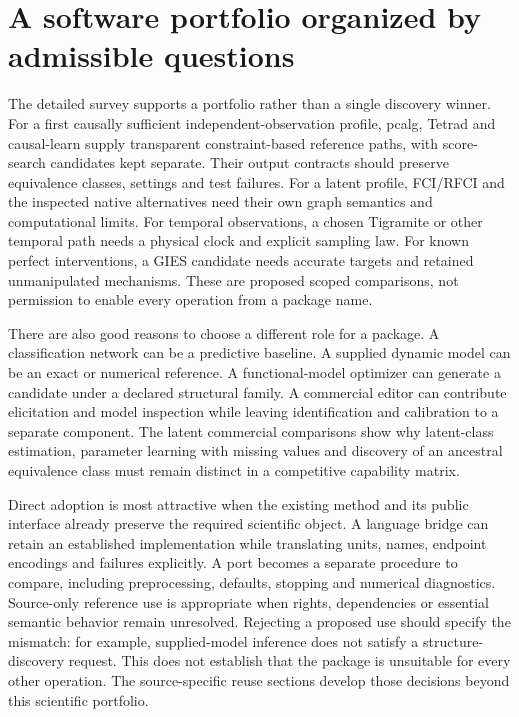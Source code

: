 \section{A software portfolio organized by admissible questions}

The detailed survey supports a portfolio rather than a single discovery
winner. For a first causally sufficient independent-observation profile,
pcalg, Tetrad and causal-learn supply transparent constraint-based reference
paths, with score-search candidates kept separate. Their output contracts
should preserve equivalence classes, settings and test failures. For a latent
profile, FCI/RFCI and the inspected native alternatives need their own graph
semantics and computational limits. For temporal observations, a chosen
Tigramite or other temporal path needs a physical clock and explicit sampling
law. For known perfect interventions, a GIES candidate needs accurate targets
and retained unmanipulated mechanisms. These are proposed scoped comparisons,
not permission to enable every operation from a package name.
\citep{exec13_pcalg,exec13_java_tetrad,exec13_pydisc_causallearn,exec13_latentr_primary,exec14_pt_tigramite,exec16_ct_pcalg}

There are also good reasons to choose a different role for a package. A
classification network can be a predictive baseline. A supplied dynamic model
can be an exact or numerical reference. A functional-model optimizer can
generate a candidate under a declared structural family. A commercial editor
can contribute elicitation and model inspection while leaving identification
and calibration to a separate component. The latent commercial comparisons
show why latent-class estimation, parameter learning with missing values and
discovery of an ancestral equivalence class must remain distinct in a
competitive capability matrix. \citep{exec13_java_weka,exec16_ct_agrum,exec16_ct_mocapy,exec13_latent_genie_structure,exec13_latent_mplus}

Direct adoption is most attractive when the existing method and its public
interface already preserve the required scientific object. A language bridge
can retain an established implementation while translating units, names,
endpoint encodings and failures explicitly. A port becomes a separate
procedure to compare, including preprocessing, defaults, stopping and numerical
diagnostics. Source-only reference use is appropriate when rights, dependencies
or essential semantic behavior remain unresolved. Rejecting a proposed use
should specify the mismatch: for example, supplied-model inference does not
satisfy a structure-discovery request. This does not establish that the package
is unsuitable for every other operation. The source-specific reuse sections
develop those decisions beyond this scientific portfolio.

